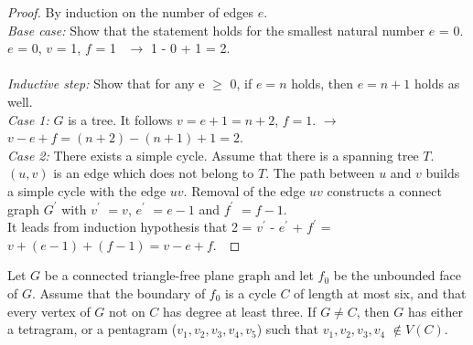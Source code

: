 \begin{proof}
By induction on the number of edges $e$.\\
\textit{Base case: } Show that the statement holds for the smallest natural number $e$ = 0.\\
$e$ = 0, $v$ = 1, $f$ = 1 \ $\xrightarrow{}$ 1 - 0 + 1 = 2. \\
\\
\textit{Inductive step: }Show that for any e $\geq$ 0, if $e = n$ holds, then $e = n + 1$ holds as well. \\
\textit{Case 1: }$G$ is a tree. It follows $v = e + 1 = n + 2$, $f = 1$. $\longrightarrow$ $v - e + f = (n + 2) - (n+1) + 1 = 2$.\\
\textit{Case 2: }There exists a simple cycle. Assume that there is a spanning tree $T$. $(u, v)$ is an edge which does not belong to $T$. The path between $u$ and $v$ builds a simple cycle with the edge $uv$. Removal of the edge $uv$ constructs a connect graph $G^{'}$ with $v^{'}$ $ = v$, $e^{'}$ $=e - 1$ and $f^{'}$ $= f - 1$. \\
It leads from induction hypothesis that 2 = $v^{'}$ - $e^{'}$ + $f^{'}$ = $v + (e - 1) + (f - 1) = v - e + f$.\
\end{proof}

\begin{lemma}
Let $G$ be a connected triangle-free plane graph and let $f_0$ be the
unbounded face of $G$. Assume that the boundary of $f_0$ is a cycle $C$ of length
at most six, and that every vertex of $G$ not on $C$ has degree at least three. If
$G \ne C$, then $G$ has either a tetragram, or a pentagram ($v_1, v_2, v_3, v_4, v_5$) such
that $v_1, v_2, v_3, v_4$ $\notin V(C)$. \cite{dvorak2013threecoloring}
\end{lemma}

